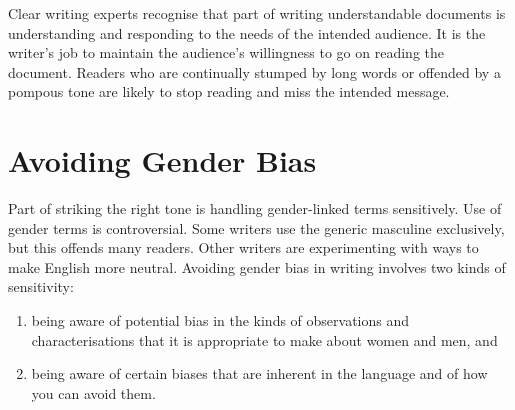 Clear writing experts recognise that part of writing understandable
documents is understanding and responding to the needs of the intended
audience. It is the writer's job to maintain the audience's
willingness to go on reading the document. Readers who are continually
stumped by long words or offended by a pompous tone are likely to stop
reading and miss the intended message.








\section{Avoiding Gender Bias}
\label{sec:Gender}

Part of striking the right tone is handling gender-linked terms
sensitively. Use of gender terms is controversial. Some writers use
the generic masculine exclusively, but this offends many readers.
Other writers are experimenting with ways to make English more
neutral. Avoiding gender bias in writing involves two kinds of
sensitivity:
\begin{enumerate}
\item being aware of potential bias in the kinds of observations and
  characterisations that it is appropriate to make about women and men,
  and

\item being aware of certain biases that are inherent in the language
  and of how you can avoid them.
\end{enumerate}


